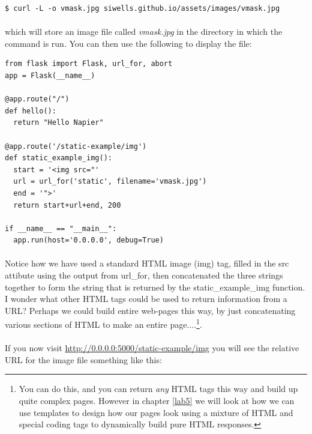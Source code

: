 \documentclass[12pt, a4paper, twoside]{book}
\begin{document}
\begin{lstlisting}[style=DOS]
    $ curl -L -o vmask.jpg siwells.github.io/assets/images/vmask.jpg 
\end{lstlisting}

\paragraph{} which will store an image file called \emph{vmask.jpg} in the directory in which the command is run. You can then use the following to display the file:

\begin{lstlisting}
from flask import Flask, url_for, abort
app = Flask(__name__)

@app.route("/")
def hello():
  return "Hello Napier"

@app.route('/static-example/img')
def static_example_img():
  start = '<img src="'
  url = url_for('static', filename='vmask.jpg')
  end = '">'
  return start+url+end, 200

if __name__ == "__main__":
  app.run(host='0.0.0.0', debug=True)
\end{lstlisting}

\paragraph{} Notice how we have used a standard HTML image (img) tag, filled in the src attibute using the output from url\_for, then concatenated the three strings together to form the string that is returned by the static\_example\_img function. I wonder what other HTML tags could be used to return information from a URL? Perhaps we could build entire web-pages this way, by just concatenating various sections of HTML to make an entire page....\footnote{You can do this, and you can return \emph{any} HTML tags this way and build up quite complex pages. However in chapter \ref{lab5} we will look at how we can use templates to design how our pages look using a mixture of HTML and special coding tags to dynamically build pure HTML responses.}.

\paragraph{} If you now visit \url{http://0.0.0.0:5000/static-example/img} you will see the relative URL for the image file something like this:
\end{document}
